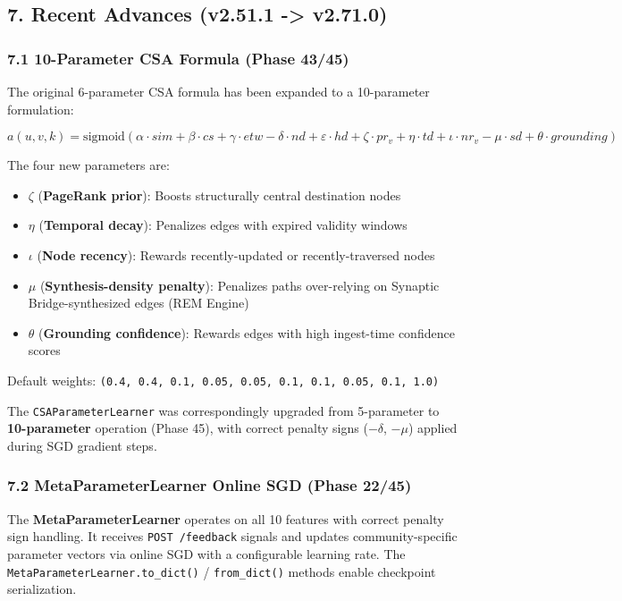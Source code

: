 \subsection*{7. Recent Advances (v2.51.1 -> v2.71.0)}

\subsubsection*{7.1 10-Parameter CSA Formula (Phase 43/45)}
The original 6-parameter CSA formula has been expanded to a 10-parameter formulation:

$$a(u,v,k) = \text{sigmoid}(\alpha \cdot sim + \beta \cdot cs + \gamma \cdot etw - \delta \cdot nd + \varepsilon \cdot hd + \zeta \cdot pr_v + \eta \cdot td + \iota \cdot nr_v - \mu \cdot sd + \theta \cdot grounding)$$

The four new parameters are:
\begin{itemize}
  \item $\zeta$ (\textbf{PageRank prior}): Boosts structurally central destination nodes
  \item $\eta$ (\textbf{Temporal decay}): Penalizes edges with expired validity windows
  \item $\iota$ (\textbf{Node recency}): Rewards recently-updated or recently-traversed nodes
  \item $\mu$ (\textbf{Synthesis-density penalty}): Penalizes paths over-relying on Synaptic Bridge-synthesized edges (REM Engine)
  \item $\theta$ (\textbf{Grounding confidence}): Rewards edges with high ingest-time confidence scores
\end{itemize}


Default weights: \texttt{(0.4, 0.4, 0.1, 0.05, 0.05, 0.1, 0.1, 0.05, 0.1, 1.0)}

The \texttt{CSAParameterLearner} was correspondingly upgraded from 5-parameter to \textbf{10-parameter} operation (Phase 45), with correct penalty signs ($-\delta$, $-\mu$) applied during SGD gradient steps.

\subsubsection*{7.2 MetaParameterLearner Online SGD (Phase 22/45)}
The \textbf{MetaParameterLearner} operates on all 10 features with correct penalty sign handling. It receives \texttt{POST /feedback} signals and updates community-specific parameter vectors via online SGD with a configurable learning rate. The \texttt{MetaParameterLearner.to\_dict()} / \texttt{from\_dict()} methods enable checkpoint serialization.

